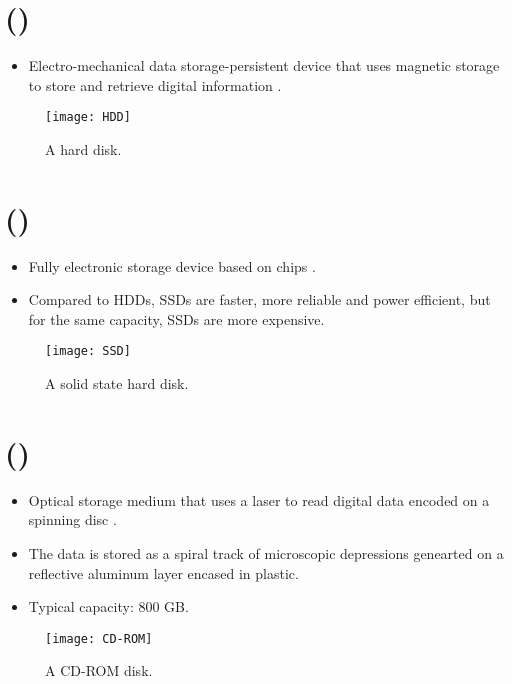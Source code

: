 \section{ ()}
\begin{itemize}
\item Electro-mechanical data storage-persistent device that uses
  magnetic storage to store and retrieve digital information
  \cite{wikipedia_NDD}.
\end{itemize}
\begin{figure}[H]
  \vspace{-1ex}
  \centering
  \texttt{[image: HDD]}
  \caption{A hard disk.}
  \label{fig:HDD}
\end{figure}

\section{ ()}
\begin{itemize}
\item Fully electronic storage device based on  chips \cite{wikipedia_SSD}.
\item Compared to \gls{HDD}s, \gls{SSD}s are faster, more reliable and
  power efficient, but for the same capacity, \gls{SSD}s are more
  expensive.
\end{itemize}
\begin{figure}[H]
  \vspace{-1ex}
  \centering
  \texttt{[image: SSD]}
  \caption{A solid state hard disk.}
  \label{fig:SSD}
\end{figure}

\section{ ({)}}
\begin{itemize}
\item Optical storage medium that uses a laser to read digital data
  encoded on a spinning disc \cite{wikipedia_CD-ROM}.
\item The data is stored as a spiral track of microscopic depressions
  genearted on a reflective aluminum layer encased in plastic.
\item Typical capacity: 800 GB.
\end{itemize}
\begin{figure}[H]
  \vspace{-4ex}
  \centering
  \texttt{[image: CD-ROM]}
  \caption{A \gls{CD-ROM} disk.}
  \label{fig:CD-ROM}
\end{figure}
  
